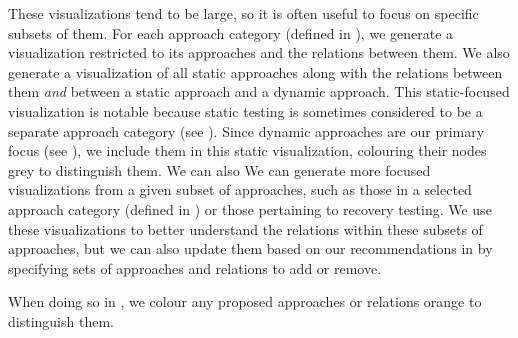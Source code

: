 \fi
These visualizations tend to be large, so it is often useful to focus on
specific subsets of them. \ifnotpaper For each approach category (defined in
    ), we generate a visualization restricted to its approaches
    and the relations between them. We also generate a visualization of all static
    approaches along with the relations between them \emph{and} between a
    static approach and a dynamic approach. This static-focused visualization is
    notable because static testing is sometimes considered to be a separate
    approach category (see ). Since dynamic
    approaches are our primary focus (see ), we include them
    in this static visualization, colouring their nodes grey to distinguish them.
    We can also \else We can \fi generate more focused visualizations from a
given subset of approaches, such as \ifnotpaper\else those in a selected
    approach category (defined in ) or \fi those pertaining to
recovery testing. %
We use these visualizations to better understand the relations within these
subsets of approaches, but we can also update them based on
our recommendations \ifnotpaper in  \fi by specifying sets of
approaches and relations to add or remove. %
\ifnotpaper
    
\else
    When doing so in , we colour any proposed approaches
    or relations orange to distinguish them.
\fi
